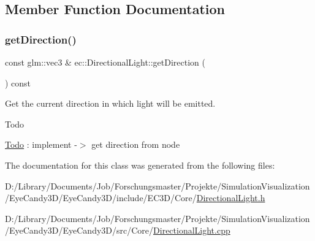 \subsection{Member Function Documentation}
\mbox{\label{classec_1_1_directional_light_af7bdf6f7576f38b48a8b6aa7301ef04e}} 
\subsubsection{\texorpdfstring{get\+Direction()}{getDirection()}}
{\footnotesize\ttfamily const glm\+::vec3 \& ec\+::\+Directional\+Light\+::get\+Direction (\begin{DoxyParamCaption}{ }\end{DoxyParamCaption}) const}



Get the current direction in which light will be emitted. 

\begin{DoxyRefDesc}{Todo}
\item[\mbox{\hyperlink{todo__todo000002}{Todo}}]\+: implement -\/$>$ get direction from node \end{DoxyRefDesc}


The documentation for this class was generated from the following files\+:\begin{DoxyCompactItemize}
\item 
D\+:/\+Library/\+Documents/\+Job/\+Forschungsmaster/\+Projekte/\+Simulation\+Visualization/\+Eye\+Candy3\+D/\+Eye\+Candy3\+D/include/\+E\+C3\+D/\+Core/\mbox{\hyperlink{_directional_light_8h}{Directional\+Light.\+h}}\item 
D\+:/\+Library/\+Documents/\+Job/\+Forschungsmaster/\+Projekte/\+Simulation\+Visualization/\+Eye\+Candy3\+D/\+Eye\+Candy3\+D/src/\+Core/\mbox{\hyperlink{_directional_light_8cpp}{Directional\+Light.\+cpp}}\end{DoxyCompactItemize}
